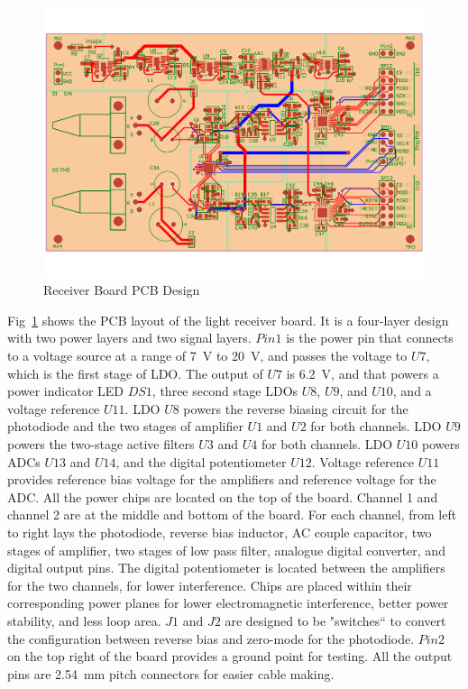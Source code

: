 \begin{figure}[!ht]
\centering
\includegraphics[width=0.9\linewidth]{4-ANC_Sys/PCB1_24-5-2023.pdf}
\caption{Receiver Board PCB Design}
\label{fig_PCB}
\end{figure}


Fig~\ref{fig_PCB} shows the PCB layout of the light receiver board.  It is a four-layer design with two power layers and two signal layers.  $Pin1$ is the power pin that connects to a voltage source at a range of \qty{7}{V} to \qty{20}{V}, and passes the voltage to $U7$, which is the first stage of LDO.  The output of $U7$ is \qty{6.2}{V}, and that powers a power indicator LED $DS1$, three second stage LDOs $U8$, $U9$, and $U10$, and a voltage reference $U11$.  LDO $U8$ powers the reverse biasing circuit for the photodiode and the two stages of amplifier $U1$ and $U2$ for both channels.  LDO $U9$ powers the two-stage active filters $U3$ and $U4$ for both channels.  LDO $U10$ powers ADCs $U13$ and $U14$, and the digital potentiometer $U12$.  Voltage reference $U11$ provides reference bias voltage for the amplifiers and reference voltage for the ADC.  All the power chips are located on the top of the board.  Channel 1 and channel 2 are at the middle and bottom of the board.  For each channel, from left to right lays the photodiode, reverse bias inductor, AC couple capacitor, two stages of amplifier, two stages of low pass filter, analogue digital converter, and digital output pins.  The digital potentiometer is located between the amplifiers for the two channels, for lower interference.  Chips are placed within their corresponding power planes for lower electromagnetic interference, better power stability, and less loop area.  $J1$ and $J2$ are designed to be "switches`` to convert the configuration between reverse bias and zero-mode for the photodiode.  $Pin2$ on the top right of the board provides a ground point for testing.  All the output pins are \qty{2.54}{mm} pitch connectors for easier cable making.


